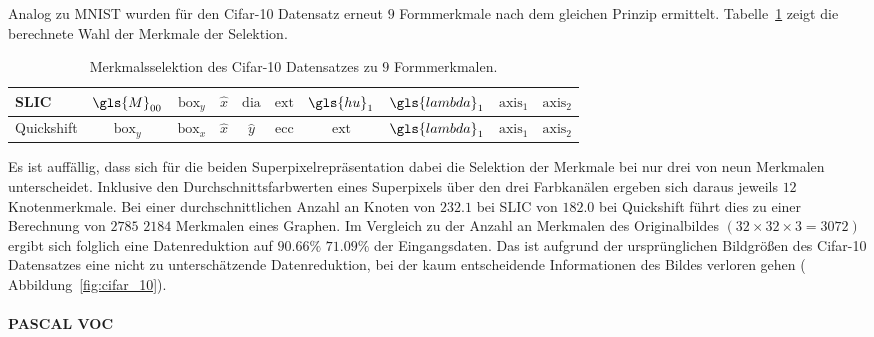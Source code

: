 Analog zu \gls{MNIST} wurden für den \gls{Cifar}-10 Datensatz erneut $9$ Formmerkmale nach dem gleichen Prinzip ermittelt.
Tabelle~\ref{tab:cifar_10_merkmale} zeigt die berechnete Wahl der Merkmale der Selektion.
\begin{table}[t]
\centering
\begin{tabular}{lccccccccc}
  \toprule
  \gls{SLIC} & $\gls{M}_{00}$ & $\mathrm{box}_y$ & $\hat x$ & $\mathrm{dia}$ & $\mathrm{ext}$ & $\gls{hu}_1$ & $\gls{lambda}_1$ & $\mathrm{axis}_1$ & $\mathrm{axis}_2$\\
  \midrule{}
  Quickshift & $\mathrm{box}_y$ & $\mathrm{box}_x$ & $\hat x$ & $\hat y$ & $\mathrm{ecc}$ & $\mathrm{ext}$ & $\gls{lambda}_1$ & $\mathrm{axis}_1$ & $\mathrm{axis}_2$\\
  \bottomrule
\end{tabular}
  \caption[\gls{Cifar}-10 Merkmalsselektion]{Merkmalsselektion des \gls{Cifar}-10 Datensatzes zu $9$ Formmerkmalen.}
\label{tab:cifar_10_merkmale}
\end{table}
Es ist auffällig, dass sich für die beiden Superpixelrepräsentation dabei die Selektion der Merkmale bei nur drei von neun Merkmalen unterscheidet.
Inklusive den Durchschnittsfarbwerten eines Superpixels über den drei Farbkanälen ergeben sich daraus jeweils $12$ Knotenmerkmale.
Bei einer durchschnittlichen Anzahl an Knoten von $232.1$ bei \gls{SLIC} \bzw{} von $182.0$ bei Quickshift führt dies zu einer Berechnung von $2785$ \bzw{} $2184$ Merkmalen eines Graphen.
Im Vergleich zu der Anzahl an Merkmalen des Originalbildes $\left(32 \times 32 \times 3 = 3072\right)$ ergibt sich folglich eine Datenreduktion auf $90.66\%$ \bzw{} $71.09\%$ der Eingangsdaten.
Das ist aufgrund der ursprünglichen Bildgrößen des \gls{Cifar}-10 Datensatzes eine nicht zu unterschätzende Datenreduktion, bei der kaum entscheidende Informationen des Bildes verloren gehen (\vgl{} Abbildung~\ref{fig:cifar_10}).

\paragraph{PASCAL VOC}
\label{pascal_voc}

